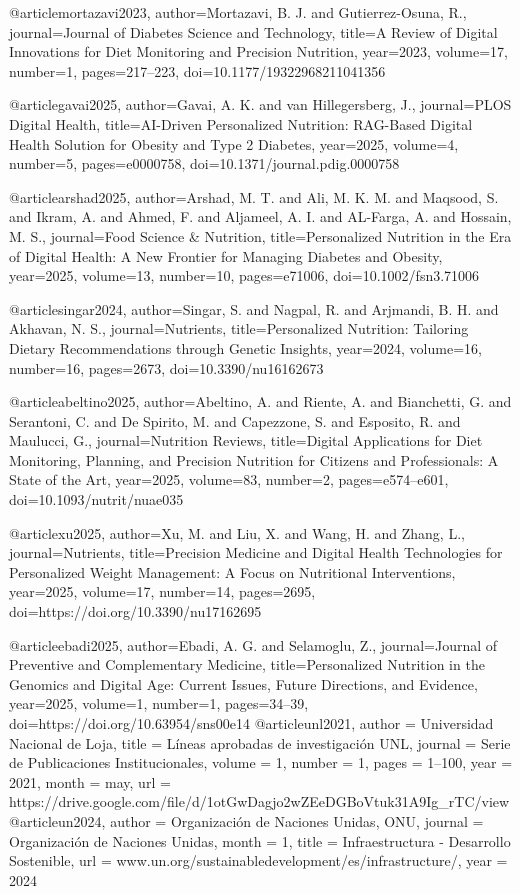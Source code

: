 @article{mortazavi2023,
author={Mortazavi, B. J. and Gutierrez-Osuna, R.},
journal={Journal of Diabetes Science and Technology},
title={A Review of Digital Innovations for Diet Monitoring and Precision Nutrition},
year={2023},
volume={17},
number={1},
pages={217--223},
doi={10.1177/19322968211041356}
}

@article{gavai2025,
author={Gavai, A. K. and van Hillegersberg, J.},
journal={PLOS Digital Health},
title={AI-Driven Personalized Nutrition: RAG-Based Digital Health Solution for Obesity and Type 2 Diabetes},
year={2025},
volume={4},
number={5},
pages={e0000758},
doi={10.1371/journal.pdig.0000758}
}

@article{arshad2025,
author={Arshad, M. T. and Ali, M. K. M. and Maqsood, S. and Ikram, A. and Ahmed, F. and Aljameel, A. I. and AL-Farga, A. and Hossain, M. S.},
journal={Food Science & Nutrition},
title={Personalized Nutrition in the Era of Digital Health: A New Frontier for Managing Diabetes and Obesity},
year={2025},
volume={13},
number={10},
pages={e71006},
doi={10.1002/fsn3.71006}
}

@article{singar2024,
author={Singar, S. and Nagpal, R. and Arjmandi, B. H. and Akhavan, N. S.},
journal={Nutrients},
title={Personalized Nutrition: Tailoring Dietary Recommendations through Genetic Insights},
year={2024},
volume={16},
number={16},
pages={2673},
doi={10.3390/nu16162673}
}

@article{abeltino2025,
author={Abeltino, A. and Riente, A. and Bianchetti, G. and Serantoni, C. and De Spirito, M. and Capezzone, S. and Esposito, R. and Maulucci, G.},
journal={Nutrition Reviews},
title={Digital Applications for Diet Monitoring, Planning, and Precision Nutrition for Citizens and Professionals: A State of the Art},
year={2025},
volume={83},
number={2},
pages={e574--e601},
doi={10.1093/nutrit/nuae035}
}

@article{xu2025,
author={Xu, M. and Liu, X. and Wang, H. and Zhang, L.},
journal={Nutrients},
title={Precision Medicine and Digital Health Technologies for Personalized Weight Management: A Focus on Nutritional Interventions},
year={2025},
volume={17},
number={14},
pages={2695},
doi={https://doi.org/10.3390/nu17162695}
}

@article{ebadi2025,
author={Ebadi, A. G. and Selamoglu, Z.},
journal={Journal of Preventive and Complementary Medicine},
title={Personalized Nutrition in the Genomics and Digital Age: Current Issues, Future Directions, and Evidence},
year={2025},
volume={1},
number={1},
pages={34--39},
doi={https://doi.org/10.63954/sns00e14}
}
@article{unl2021,
  author    = {Universidad Nacional de Loja},
  title     = {Líneas aprobadas de investigación UNL},
  journal   = {Serie de Publicaciones Institucionales},
  volume    = {1},
  number    = {1},
  pages     = {1--100},
  year      = {2021},
  month     = {may},
  url       = {https://drive.google.com/file/d/1otGwDagjo2wZEeDGBoVtuk31A9Ig_rTC/view}
}
@article{un2024,
    author = {Organización de Naciones Unidas, ONU},
   journal = {Organización de Naciones Unidas},
   month = {1},
   title = {Infraestructura - Desarrollo Sostenible},
   url = {www.un.org/sustainabledevelopment/es/infrastructure/},
   year = {2024}
}

